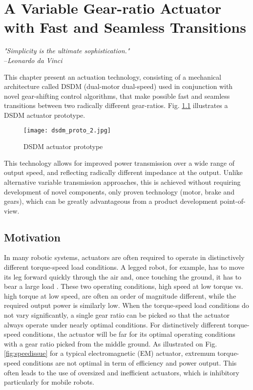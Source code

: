 \chapter{A Variable Gear-ratio Actuator with Fast and Seamless Transitions}
\label{sec:MultipleSpeedActuationTechnology}

\begin{flushright}
\textit{"Simplicity is the ultimate sophistication."} \\ --\emph{Leonardo da Vinci}
\end{flushright}

This chapter present an actuation technology, consisting of a mechanical architecture called DSDM (dual-motor dual-speed) used in conjunction with novel gear-shifting control algorithms, that make possible fast and seamless transitions between two radically different gear-ratios. Fig. \ref{fig:dsdm_proto} illustrates a DSDM actuator prototype. 

\begin{figure}[H]
	\centering
		\texttt{[image: dsdm\_proto\_2.jpg]}
	\caption{DSDM actuator prototype}
	\label{fig:dsdm_proto}
\end{figure}

This technology allows for improved power transmission over a wide range of output speed, and reflecting radically different impedance at the output. Unlike alternative variable transmission approaches, this is achieved without requiring development of novel components, only proven technology (motor, brake and gears), which can be greatly advantageous from a product development point-of-view. 

\section{Motivation}
\label{sec:mot}

In many robotic systems, actuators are often required to operate in distinctively different torque-speed load conditions. A legged robot, for example, has to move its leg forward quickly through the air and, once touching the ground, it has to bear a large load \cite{hirose_study_1984}. These two operating conditions, high speed at low torque vs. high torque at low speed, are often an order of magnitude different, while the required output power is similarly low. When the torque-speed load conditions do not vary significantly, a single gear ratio can be picked so that the actuator always operate under nearly optimal conditions. For distinctively different torque-speed conditions, the actuator will be far for its optimal operating conditions with a gear ratio picked from the middle ground. As illustrated on Fig. \ref{fig:speedissue} for a typical electromagnetic (EM) actuator, extremum torque-speed conditions are not optimal in term of efficiency and power output. This often leads to the use of oversized and inefficient actuators, which is inhibitory particularly for mobile robots.

